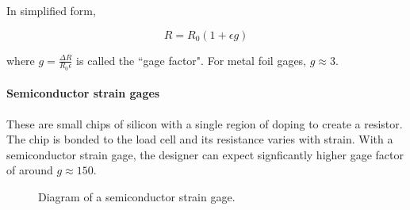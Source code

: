 
In simplified form,

\[
R = R_0 (1+\epsilon g)
\]

where $g = \frac{\Delta R}{R_0 \epsilon}$ is called the ``gage factor".
%
For metal foil gages, $g \approx 3$.



\paragraph{Semiconductor strain gages}

These are small chips of silicon with a single region of doping to
create a resistor. The chip is bonded to the load cell and its resistance
varies with strain. With a semiconductor strain gage, the designer
can expect signficantly higher gage factor of around
$g  \approx 150$.	%



\begin{figure}[ht]	%
\begin{center}
\caption{ Diagram of a semiconductor strain gage. }	%
\end{center}
\end{figure}	%


